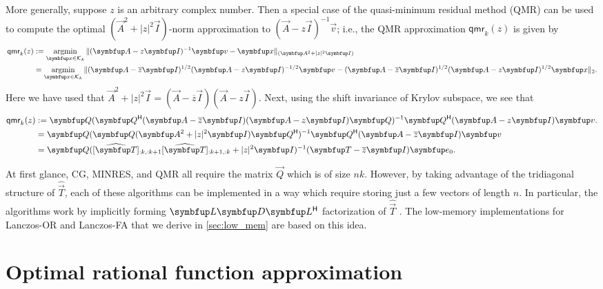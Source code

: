 More generally,  suppose $z$ is an arbitrary complex number.
Then a special case of the quasi-minimum residual method (QMR) \cite{freund_92} can be used to compute the optimal $(\vec{A}^2+|z|^2 \vec{I})$-norm
approximation to $(\vec{A}-z \vec{I})^{-1}\vec{v}$; i.e., the QMR approximation $\mathsf{qmr}_k(z)$ is given by
\begin{align}
    \mathsf{qmr}_k(z)
    &:= \argmin_{\vec{x}\in\mathcal{K}_k}
    \| (\vec{A}-z \vec{I})^{-1} \vec{v} - \vec{x} \|_{(\vec{A}^2+|z|^2 \vec{I})}
    \nonumber\\&=
    \argmin_{\vec{x}\in\mathcal{K}_k}
    \| (\vec{A}-\overline z \vec{I})^{1/2}(\vec{A}-z \vec{I})^{-1/2}\vec{v} - (\vec{A}-\overline z \vec{I})^{1/2}(\vec{A}-z \vec{I})^{1/2}\vec{x} \|_{2}.
\end{align}
Here we have used that $\vec{A}^2+|z|^2 \vec{I} = (\vec{A}-\overline z \vec{I})(\vec{A}-z \vec{I})$.
Next, using the shift invariance of Krylov subspace, we see that
\label{eqn:qmr_def}
\begin{align*}
    \mathsf{qmr}_k(z)
    &:=  \vec{Q} (\vec{Q}^\cT (\vec{A}-\overline z \vec{I})(\vec{A}-z \vec{I}) \vec{Q})^{-1} \vec{Q}^\cT (\vec{A}- z \vec{I})\vec{v}.
    \\&=  \vec{Q} ( \vec{Q}( \vec{A}^2+|z|^2 \vec{I})\vec{Q}^\cT)^{-1} \vec{Q}^\cT (\vec{A}- \overline{z} \vec{I})\vec{v}
    \\&=  \vec{Q} ([\widehat{\vec{T}}]_{:k,:k+1}[\widehat{\vec{T}}]_{:k+1,:k}+|z|^2 \vec{I})^{-1} (\vec{T} - \overline{z} \vec{I})\vec{e}_0.
\end{align*}


At first glance, CG, MINRES, and QMR all require the matrix \( \vec{Q} \) which is of size \( nk \).
However, by taking advantage of the tridiagonal structure of \( \widehat{\vec{T}} \), each of these algorithms can be implemented in a way which require storing just a few vectors of length $n$. 
In particular, the algorithms work by implicitly forming $\vec{L}\vec{D}\vec{L}^\cT$ factorization of \( \widehat{\vec{T}} \) \cite{paige_saunders_75,freund_92,liesen_strakos_13,simonova_tichy_21}.
The low-memory implementations for Lanczos-OR and Lanczos-FA that we derive in \cref{sec:low_mem} are based on this idea. 


\section{Optimal rational function approximation}


